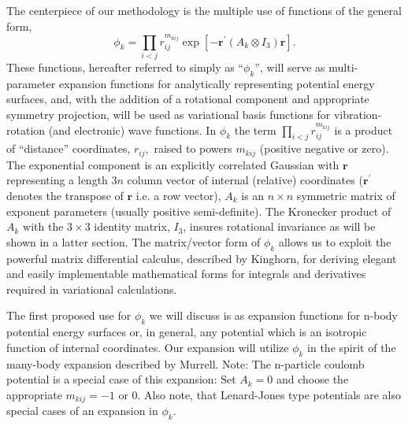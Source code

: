 \documentclass[12pt,thmsa]{article}
\begin{document}
The centerpiece of our methodology is the multiple use of functions of the
general form, 
\begin{equation}
\phi _k=\prod_{i<j}r_{ij}^{m_{kij}}\exp \left[ -\mathbf{r}^{\prime
}(A_k\otimes I_3)\mathbf{r}\right] .  \label{basisfcn}
\end{equation}
These functions, hereafter referred to simply as ``$\phi _k$'', will serve
as multi-parameter expansion functions for analytically representing
potential energy surfaces, and, with the addition of a rotational component
and appropriate symmetry projection, will be used as variational basis
functions for vibration-rotation (and electronic) wave functions. In $\phi
_k $ the term $\prod_{i<j}r_{ij}^{m_{kij}}$ is a product of ``distance''
coordinates, $r_{ij},$ raised to powers $m_{kij}$ (positive negative or
zero). The exponential component is an explicitly correlated Gaussian with $%
\mathbf{r}$ representing a length $3n$ column vector of internal (relative)
coordinates ($\mathbf{r}^{\prime }$ denotes the transpose of $\mathbf{r}$
i.e. a row vector), $A_k$ is an $n\times n$ symmetric matrix of exponent
parameters (usually positive semi-definite). The Kronecker product of $A_k$
with the $3\times 3$ identity matrix, $I_3$, insures rotational invariance
as will be shown in a latter section. The matrix/vector form of $\phi _k$
allows us to exploit the powerful matrix differential calculus, described by
Kinghorn\cite{Kinghorn95a}, for deriving elegant and easily implementable
mathematical forms for integrals and derivatives required in variational
calculations.

The first proposed use for $\phi _k$ we will discuss is as expansion
functions for n-body potential energy surfaces or, in general, any potential
which is an isotropic function of internal coordinates. Our expansion will
utilize $\phi _k$ in the spirit of the many-body expansion described by
Murrell\cite{Murrell84}. Note: The n-particle coulomb potential is a special
case of this expansion: Set $A_k=0$ and choose the appropriate $m_{kij}=-1$%
or $0$. Also note, that Lenard-Jones type potentials are also special cases
of an expansion in $\phi _k.$
\end{document}
